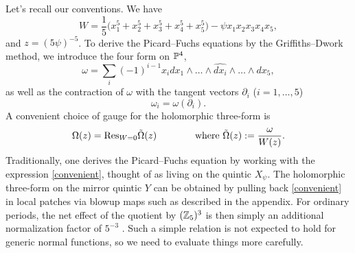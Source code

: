 Let's recall our conventions. We have
\begin{equation}
W = \frac{1}{5} \bigl(x_1^5+x_2^5+x_3^5+x_4^5+x_5^5\bigr) - \psi x_1x_2x_3x_4 x_5 ,
\end{equation}
and $z=(5\psi)^{-5}$. To derive the Picard--Fuchs equations by the Griffiths--Dwork
method, we introduce the four form on ${\mathbb P}^4$,
\begin{equation}
\omega = \sum_{i} (-1)^{i-1} x_i dx_1\wedge\ldots\wedge\widehat{dx_i}\wedge\ldots 
\wedge dx_5 ,
\end{equation}
as well as the contraction of $\omega$ with the tangent vectors $\partial_i$ 
($i=1,\ldots,5$)
\begin{equation}
\omega_i = \omega(\partial_i) .
\end{equation}
A convenient choice of gauge for the holomorphic three-form is
\begin{equation}
\eqlabel{convenient}
\Omega (z) = {\rm Res}_{W=0} \tilde\Omega(z)\qquad\qquad
\text{where }
\tilde\Omega(z) := \frac{\omega}{W(z)} .
\end{equation}
Traditionally, one derives the Picard--Fuchs equation by working with the expression 
\eqref{convenient}, thought of as living on the quintic $X_\psi$. The holomorphic 
three-form on the mirror quintic $Y$ can be obtained by pulling back \eqref{convenient}
in local patches via blowup maps such as described in the appendix. For ordinary 
periods, the net effect of the quotient by $({\mathbb Z}_5)^3$ is then simply an additional 
normalization factor of $5^{-3}$ \cite{cdgp}. Such a simple relation is not expected 
to hold for generic normal functions, so we need to evaluate things more carefully.

